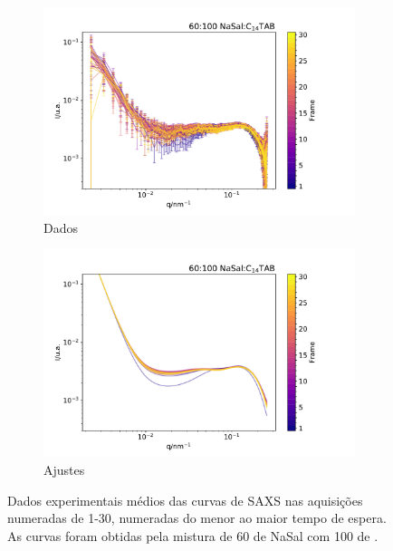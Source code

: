 	\begin{figure}[h]
		\begin{subfigure}[t]{0.5\textwidth}
			\centering
			\includegraphics[width=\textwidth]{imagens/saxs/TR_saxs_60_100_3_dados.pdf}
			\caption{Dados}
			\label{fig:saxs_tr_60_3_d}
		\end{subfigure}%
		\begin{subfigure}[t]{0.5\textwidth}
			\centering
			\includegraphics[width=\textwidth]{imagens/saxs/TR_saxs_60_100_3_ajustes.pdf}
			\caption{Ajustes}
			\label{fig:saxs_tr_60_3_a}
		\end{subfigure}
		\caption{Dados experimentais médios das curvas de SAXS nas aquisições numeradas de 1-30, numeradas do menor ao maior tempo de espera. As curvas foram obtidas pela mistura de 60 \mM{} de NaSal com 100 \mM{} de \TTAB.}
		\label{fig:saxs_tr_60_3}
	\end{figure} 

